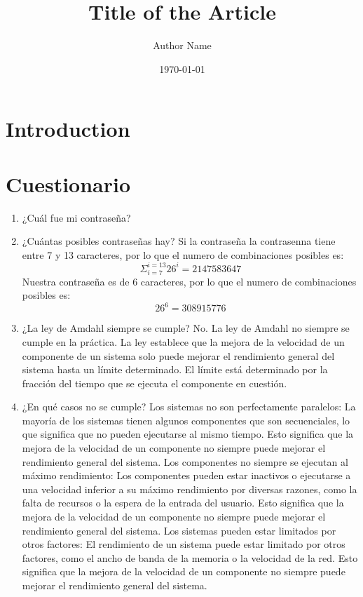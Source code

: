 \documentclass{article}
\title{Title of the Article}
\author{Author Name}
\date{\today}
\begin{document}
\maketitle

\section{Introduction}

\section{Cuestionario}

\begin{enumerate}
    \item ¿Cuál fue mi contraseña?
    
    \item ¿Cuántas posibles contraseñas hay?
    Si la contraseña la contrasenna tiene entre 7 y 13 caracteres, por lo que el numero de combinaciones posibles es:
    \[ \Sigma_{i=7}^{i=13} 26^i = 2 147 583 647\]
    Nuestra contraseña es de 6 caracteres, por lo que el numero de combinaciones posibles es:
    \[ 26^6 = 308 915 776\]

    \item ¿La ley de Amdahl siempre se cumple?
    No. La ley de Amdahl no siempre se cumple en la práctica. La ley establece que la mejora de la velocidad de un componente de un sistema solo puede mejorar el rendimiento general del sistema hasta un límite determinado. El límite está determinado por la fracción del tiempo que se ejecuta el componente en cuestión.

    \item ¿En qué casos no se cumple?
    Los sistemas no son perfectamente paralelos: La mayoría de los sistemas tienen algunos componentes que son secuenciales, lo que significa que no pueden ejecutarse al mismo tiempo. Esto significa que la mejora de la velocidad de un componente no siempre puede mejorar el rendimiento general del sistema.
    Los componentes no siempre se ejecutan al máximo rendimiento: Los componentes pueden estar inactivos o ejecutarse a una velocidad inferior a su máximo rendimiento por diversas razones, como la falta de recursos o la espera de la entrada del usuario. Esto significa que la mejora de la velocidad de un componente no siempre puede mejorar el rendimiento general del sistema.
    Los sistemas pueden estar limitados por otros factores: El rendimiento de un sistema puede estar limitado por otros factores, como el ancho de banda de la memoria o la velocidad de la red. Esto significa que la mejora de la velocidad de un componente no siempre puede mejorar el rendimiento general del sistema.


\end{enumerate}
\end{document}
